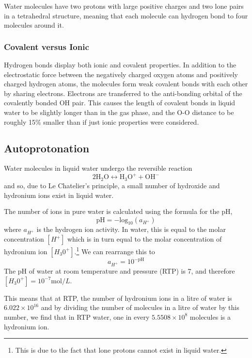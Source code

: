 \documentclass{article}
\begin{document}
\begin{multicols}{2}
Water molecules have two protons with large positive charges and two lone pairs in a tetrahedral structure, meaning that each molecule can hydrogen bond to four molecules around it.

\subsubsection{Covalent versus Ionic}
Hydrogen bonds display both ionic and covalent properties.\cite{Weinhold2014} In addition to the electrostatic force between the negatively charged oxygen atoms and positively charged hydrogen atoms, the molecules form weak covalent bonds with each other by sharing electrons. Electrons are transferred to the anti-bonding orbital of the covalently bonded OH pair. This causes the length of covalent bonds in liquid water to be slightly longer than in the gas phase, and the O-O distance to be roughly 15\% smaller than if just ionic properties were considered.\cite{Hbonding}

\subsection{Autoprotonation}
\label{sec:autoprotonation}
Water molecules in liquid water undergo the reversible reaction
\begin{equation}
	2\text{H}_{2}\text{O} \leftrightarrow \text{H}_{3}\text{O}^{+} + \text{OH}^{-}
\end{equation}
and so, due to Le Chatelier's principle,\cite{le1898limits} a small number of hydroxide and hydronium ions exist in liquid water.

The number of ions in pure water is calculated using the formula for the pH,
\begin{equation}
	\textrm{pH}=-\textrm{log}_{10}(a_{H^+})
\end{equation}
where $a_{H^{+}}$ is the hydrogen ion activity. In water, this is equal to the molar concentration $[H^{+}]$ which is in turn equal to the molar concentration of hydronium ion $[H_{3}0^{+}]$.\footnote{This is due to the fact that lone protons cannot exist in liquid water.\cite{bell2013proton}} We can rearrange this to 
\begin{equation}
	a_{H^+} = 10^{-\textrm{pH}}
\end{equation}
The pH of water at room temperature and pressure (RTP) is 7, and therefore $[H_{3}0^{+}] = 10^{-7}\text{mol}/L$. 

This means that at RTP, the number of hydronium ions in a litre of water is $6.022 \times 10^{16}$ and by dividing the number of molecules in a litre of water by this number, we find that in RTP water, one in every $5.5508\times10^{8}$ molecules is a hydronium ion.

\end{multicols}
\end{document}
